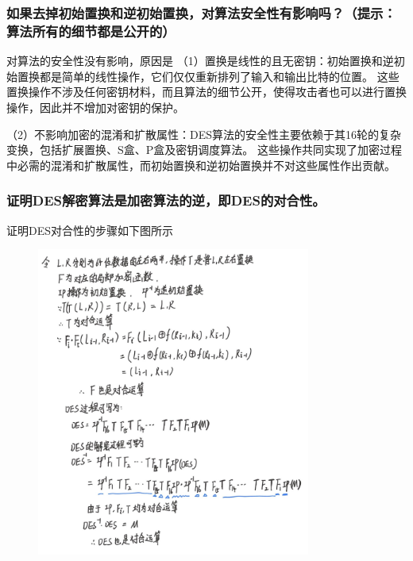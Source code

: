 \documentclass[a4paper,11pt,UTF8]{ctexart}
\newcommand{\bottomcaption}{%
\setlength{\abovecaptionskip}{6pt}%
\setlength{\belowcaptionskip}{6pt}%
\caption}
\newcommand{\xiaowuhao}{\fontsize{9pt}{\baselineskip}\selectfont}   %
\begin{document}
        \subsubsection{如果去掉初始置换和逆初始置换，对算法安全性有影响吗？（提示：算法所有的细节都是公开的）}
            对算法的安全性没有影响，原因是
            （1）置换是线性的且无密钥：初始置换和逆初始置换都是简单的线性操作，它们仅仅重新排列了输入和输出比特的位置。
            这些置换操作不涉及任何密钥材料，而且算法的细节公开，使得攻击者也可以进行置换操作，因此并不增加对密钥的保护。\par
            （2）不影响加密的混淆和扩散属性：DES算法的安全性主要依赖于其16轮的复杂变换，包括扩展置换、S盒、P盒及密钥调度算法。
            这些操作共同实现了加密过程中必需的混淆和扩散属性，而初始置换和逆初始置换并不对这些属性作出贡献。\par
        \subsubsection{证明DES解密算法是加密算法的逆，即DES的对合性。}
            证明DES对合性的步骤如下图所示
            \begin{figure}[H]
                \centering
                \includegraphics[width=9cm]{对合性.jpg}
                \bottomcaption{\xiaowuhao{DES对合性证明}}
            \end{figure}
\newpage
\end{document}
